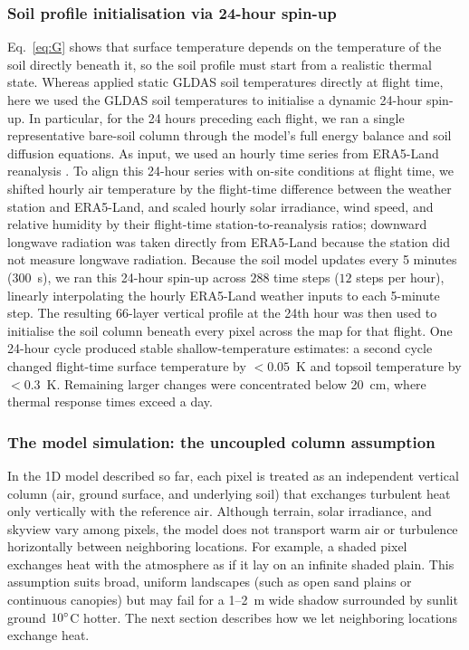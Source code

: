 \documentclass[12pt]{article}
\begin{document}
\subsubsection{Soil profile initialisation via 24-hour spin-up}

\noindent Eq.~\ref{eq:G} shows that surface temperature depends on the temperature of the soil directly beneath it, so the soil profile must start from a realistic thermal state. Whereas \citet{Itzkovitch2025} applied static GLDAS soil temperatures directly at flight time, here we used the GLDAS soil temperatures to initialise a dynamic 24-hour spin-up. In particular, for the 24 hours preceding each flight, we ran a single representative bare-soil column through the model's full energy balance and soil diffusion equations. As input, we used an hourly time series from ERA5-Land reanalysis \citep{munozsabater_2021}. To align this 24-hour series with on-site conditions at flight time, we shifted hourly air temperature by the flight-time difference between the weather station and ERA5-Land, and scaled hourly solar irradiance, wind speed, and relative humidity by their flight-time station-to-reanalysis ratios; downward longwave radiation was taken directly from ERA5-Land because the station did not measure longwave radiation. Because the soil model updates every 5 minutes ($300$~s), we ran this 24-hour spin-up across $288$ time steps ($12$ steps per hour), linearly interpolating the hourly ERA5-Land weather inputs to each 5-minute step. The resulting 66-layer vertical profile at the 24th hour was then used to initialise the soil column beneath every pixel across the map for that flight. One 24-hour cycle produced stable shallow-temperature estimates: a second cycle changed flight-time surface temperature by $<0.05$~K and topsoil temperature by $<0.3$~K. Remaining larger changes were concentrated below 20~cm, where thermal response times exceed a day.

\subsubsection{The model simulation: the uncoupled column assumption}

\noindent In the 1D model described so far, each pixel is treated as an independent vertical column (air, ground surface, and underlying soil) that exchanges turbulent heat only vertically with the reference air. Although terrain, solar irradiance, and skyview vary among pixels, the model does not transport warm air or turbulence horizontally between neighboring locations. For example, a shaded pixel exchanges heat with the atmosphere as if it lay on an infinite shaded plain. This assumption suits broad, uniform landscapes (such as open sand plains or continuous canopies) but may fail for a 1--2~m wide shadow surrounded by sunlit ground $10\degree$C hotter. The next section describes how we let neighboring locations exchange heat.
\end{document}
